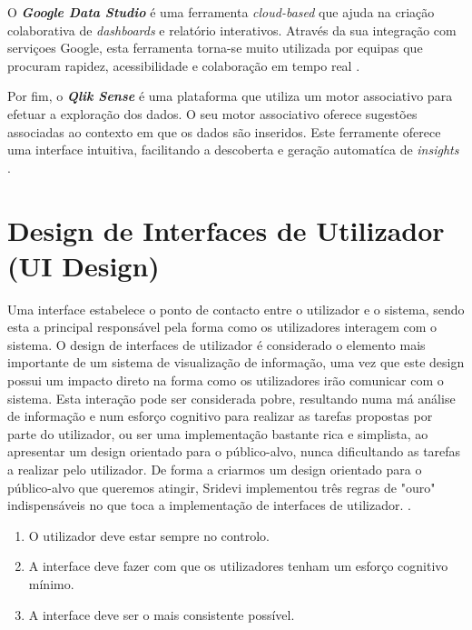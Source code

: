 O \textbf{\textit{Google Data Studio}} \cite{googleStudio} é uma ferramenta \textit{cloud-based} que ajuda na criação colaborativa de \textit{dashboards} e relatório interativos. Através da sua integração com serviçoes Google, esta ferramenta torna-se muito utilizada por equipas que procuram rapidez, acessibilidade e colaboração em tempo real \cite{richardson2020magic}.

Por fim, o \textbf{\textit{Qlik Sense}} \cite{qlik} é uma plataforma que utiliza um motor associativo para efetuar a exploração dos dados. O seu motor associativo oferece sugestões associadas ao contexto em que os dados são inseridos. Este ferramente oferece uma interface intuitiva, facilitando a descoberta e geração automatíca de \textit{insights} \cite{richardson2020magic}.

\section{Design de Interfaces de Utilizador (UI Design)} %
\label{sec:ui_design}

Uma interface estabelece o ponto de contacto entre o utilizador e o sistema, sendo esta a principal responsável pela forma como os utilizadores interagem com o sistema. O design de interfaces de utilizador é considerado o elemento mais importante de um sistema de visualização de informação, uma vez que este design possui um impacto direto na forma como os utilizadores irão comunicar com o sistema. Esta interação pode ser considerada pobre, resultando numa má análise de informação e num esforço cognitivo para realizar as tarefas propostas por parte do utilizador, ou ser uma implementação bastante rica e simplista, ao apresentar um design orientado para o público-alvo, nunca dificultando as tarefas a realizar pelo utilizador. De forma a criarmos um design orientado para o público-alvo que queremos atingir, Sridevi implementou três regras de "ouro" indispensáveis no que toca a implementação de interfaces de utilizador. \cite{sridevi2014user}.

\begin{enumerate}
  \item O utilizador deve estar sempre no controlo.
  \item A interface deve fazer com que os utilizadores tenham um esforço cognitivo mínimo.
  \item A interface deve ser o mais consistente possível.
\end{enumerate}

